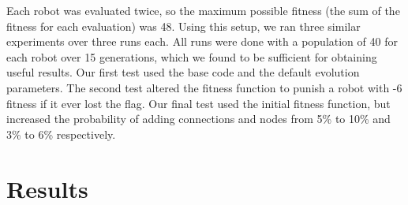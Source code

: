 \documentclass[11pt]{article}
\begin{document}
Each robot was evaluated twice, so the maximum possible fitness (the sum of the fitness for each evaluation) was 48. Using this setup, we ran three similar experiments over three runs each. All runs were done with a population of 40 for each robot over 15 generations, which we found to be sufficient for obtaining useful results. Our first test used the base code and the default evolution parameters. The second test altered the fitness function to punish a robot with -6 fitness if it ever lost the flag. Our final test used the initial fitness function, but increased the probability of adding connections and nodes from 5\% to 10\% and 3\% to 6\% respectively.

\section{Results}
\end{document}
